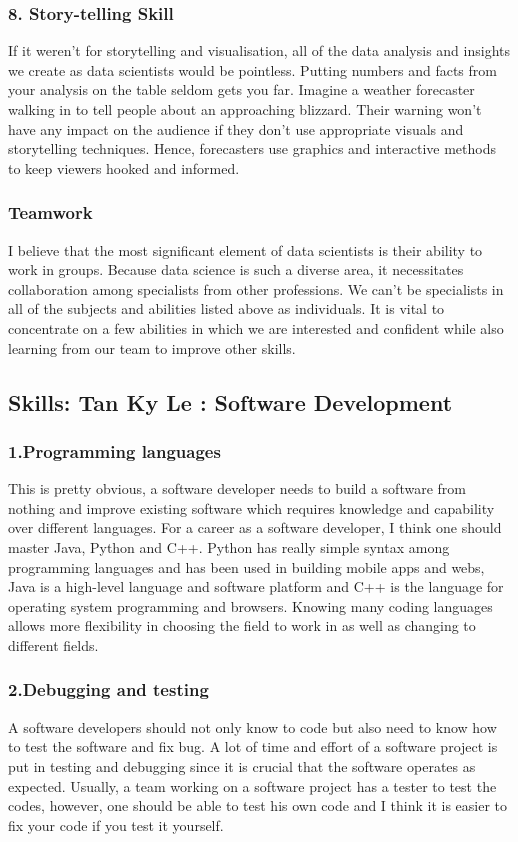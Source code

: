 \documentclass[a4paper, 11pt]{report}
\begin{document}
    \subsubsection{8. Story-telling Skill}
    If it weren't for storytelling and visualisation, all of the data analysis and insights we create as data scientists would be pointless. Putting numbers and facts from your analysis on the table seldom gets you far. Imagine a weather forecaster walking in to tell people about an approaching blizzard. Their warning won't have any impact on the audience if they don't use appropriate visuals and storytelling techniques.\cite{isaac7} Hence, forecasters use graphics and interactive methods to keep viewers hooked and informed. \cite{isaac7}

    \subsubsection{Teamwork}
    I believe that the most significant element of data scientists is their ability to work in groups. Because data science is such a diverse area, it necessitates collaboration among specialists from other professions. We can't be specialists in all of the subjects and abilities listed above as individuals. It is vital to concentrate on a few abilities in which we are interested and confident while also learning from our team to improve other skills.

\subsection{Skills: Tan Ky Le : Software Development}
	\subsubsection{1.Programming languages}
	This is pretty obvious, a software developer needs to build a software from nothing and improve existing software which requires knowledge and capability over different languages. For a career as a software developer, I think one should master Java, Python and C++. Python has really simple syntax among programming languages and has been used in building mobile apps and webs, Java is a high-level language and software platform and C++ is the language for operating system programming and browsers\cite{ky1}. Knowing many coding languages allows more flexibility in choosing the field to work in as well as changing to different fields.
	\subsubsection{2.Debugging and testing}
	A software developers should not only know to code but also need to know how to test the software and fix bug. A lot of time and effort of a software project is put in testing and debugging since it is crucial that the software operates as expected. Usually, a team working on a software project has a tester to test the codes, however, one should be able to test his own code and I think it is easier to fix your code if you test it yourself. \cite{ky2}
\end{document}
